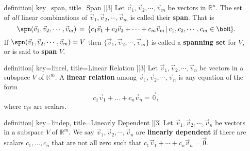 \begin{SaveConcept}{definition}[
		key=span,
		title={Span}
	][3]
        Let $\vec v_1, \vec v_2,\cdots, \vec v_m$ be vectors in $\mathbb R^n$. The set of {\it all} linear combinations of $\vec v_1, \vec v_2,\cdots, \vec v_m$ is called their \textbf{span}. That is 
        \[
         \spn(\vec v_1, \vec v_2,\cdots, \vec v_m) \, = \, \{ c_1 \vec v_1 + c_2 \vec v_2 + \dots + c_m \vec v_m \, | \, c_1, c_2,\cdots,c_m \in \bbR\}.
        \]
       If $\spn(\vec v_1, \vec v_2,\cdots, \vec v_m)=V$ then $\{\vec v_1, \vec v_2,\cdots, \vec v_m\}$ is called a \textbf{spanning set} for $V$, or is said to \textbf{span} $V$.
\end{SaveConcept}

\begin{SaveConcept}{definition}[
		key=linrel,
		title={Linear Relation}
	][3]
        Let $\vec v_1, \vec v_2, \cdots ,\vec v_n$ be vectors in a subspace $V$ of $\mathbb R^m$. A {\bf linear relation} among $\vec v_1, \vec v_2, \cdots ,\vec v_n$ is any equation of the form 
        $$
        c_1 \vec v_1  +  \dots + c_n \vec v_n = \vec{0},
        $$
        where $c_i$s are scalars.
\end{SaveConcept}



\begin{SaveConcept}{definition}[
		key=lindep,
		title={Linearly Dependent}
	][3]
        Let $\vec v_1, \vec v_2, \cdots ,\vec v_n$ be vectors in a subspace $V$ of $\mathbb R^m$. We say $\vec v_1, \vec v_2, \cdots ,\vec v_n$ are {\bf linearly dependent} if there are scalars $c_1,\ldots,c_n$ that are not all zero such that $c_1\vec{v}_1+\cdots+c_n\vec{v}_n=\vec{0}$.
\end{SaveConcept}




